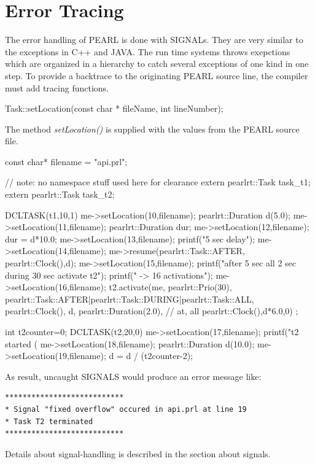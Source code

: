 \section{Error Tracing}
The error handling of PEARL is done with SIGNALs.
They are very similar to the exceptions in C++ and JAVA. 
The run time systems throws exepctions which are organized in a
hierarchy to catch several exceptions of one kind in one step.
To provide a backtrace to the originating PEARL source line, the compiler 
must add tracing functions.
\begin{CppCode}
Task::setLocation(const char * fileName, int lineNumber);
\end{CppCode}
The method {\em setLocation()} is supplied with the values from
the PEARL source file.

\begin{CppCode}
const char* filename =  "api.prl";

// note: no namespace stuff used here for clearance
extern pearlrt::Task task_t1;
extern pearlrt::Task task_t2;

DCLTASK(t1,10,1) {
   me->setLocation(10,filename);
   pearlrt::Duration d(5.0);
   me->setLocation(11,filename);
   pearlrt::Duration dur;
   me->setLocation(12,filename);
   dur = d*10.0;
   me->setLocation(13,filename);
   printf("5 sec delay\n");
   me->setLocation(14,filename);
   me->resume(pearlrt::Task::AFTER, pearlrt::Clock(),d);
   me->setLocation(15,filename);    
   printf("after 5 sec all 2 sec during 30 sec activate  t2\n");
   printf("    -> 16 activations\n");
   me->setLocation(16,filename);
   t2.activate(me, pearlrt::Prio(30),
               pearlrt::Task::AFTER|pearlrt::Task::DURING|pearlrt::Task::ALL,
               pearlrt::Clock(), d, pearlrt::Duration(2.0), // at, all
               pearlrt::Clock(),d*6.0,0) ;    
}

int t2counter=0;
DCLTASK(t2,20,0) {
   me->setLocation(17,filename);
   printf("t2 started (%
   me->setLocation(18,filename);
   pearlrt::Duration d(10.0);
   me->setLocation(19,filename);
   d = d / (t2counter-2);
}
\end{CppCode}

As result, uncaught SIGNALS would produce an error message like:
\begin{verbatim}
***************************
* Signal "fixed overflow" occured in api.prl at line 19
* Task T2 terminated
***************************
\end{verbatim}

Details about signal-handling is described in the section about signals.

